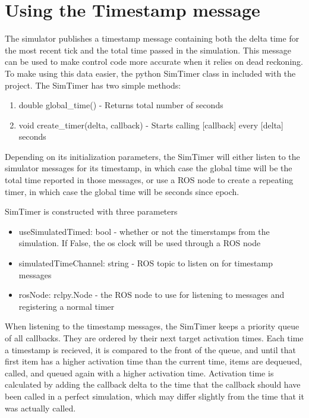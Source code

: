 \documentclass[letterpaper,10pt,english]{sphinxmanual}
\begin{document}
\chapter{Using the Timestamp message}
\label{\detokenize{index:using-the-timestamp-message}}
The simulator publishes a timestamp message containing
both the delta time for the most recent tick and the total time passed in the
simulation. This message can be used to make control code more accurate when it relies
on dead reckoning. To make using this data easier, the python SimTimer class in included
with the project. The SimTimer has two simple methods:
\begin{enumerate}
\item {} 
double global\_time() - Returns total number of seconds

\item {} 
void create\_timer(delta, callback) - Starts calling {[}callback{]} every {[}delta{]} seconds

\end{enumerate}

Depending on its initialization parameters, the SimTimer will either listen
to the simulator messages for its timestamp, in which case the global time
will be the total time reported in those messages, or use a ROS node to create
a repeating timer, in which case the global time will be seconds since epoch.

%
\begin{sphinxVerbatim}[commandchars=\\\{\}]
   
\end{sphinxVerbatim}

SimTimer is constructed with three parameters
\begin{itemize}
\item {} 
useSimulatedTimed: bool - whether or not the timerstamps from the simulation. If False, the os clock will be used through a ROS node

\item {} 
simulatedTimeChannel: string - ROS topic to listen on for timestamp messages

\item {} 
rosNode: rclpy.Node - the ROS node to use for listening to messages and registering a normal timer

\end{itemize}

When listening to the timestamp messages, the SimTimer keeps a priority queue of all
callbacks. They are ordered by their next target activation times. Each time a timestamp
is recieved, it is compared to the front of the queue, and until that first item has a
higher activation time than the current time, items are dequeued, called, and queued
again with a higher activation time. Activation time is calculated by adding the
callback delta to the time that the callback should have been called in a perfect
simulation, which may differ slightly from the time that it was actually called.
\end{document}
